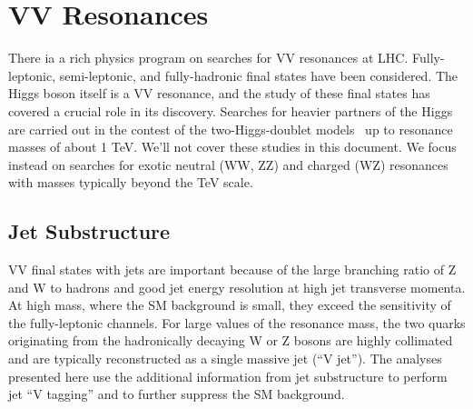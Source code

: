 \documentclass[3p,times,twocolumn]{elsarticle}
\begin{document}

\section{VV Resonances}
\label{sec:VV}

There ia a rich physics program on searches for VV resonances at LHC.
Fully-leptonic, semi-leptonic, and fully-hadronic final states have 
been considered. 
The Higgs boson itself is a VV resonance, and the study of these final
states has covered a crucial role in its discovery. Searches for
heavier partners of the Higgs are carried out in the contest 
of the two-Higgs-doublet models~\cite{Branco:2011iw} up to resonance
masses of about 1 TeV. We'll not cover these studies in this
document. We focus instead on searches for exotic neutral (WW, ZZ) and
charged (WZ) resonances with masses typically beyond the TeV scale. 

\subsection{Jet Substructure}
\label{sec:JetSubstructure}
VV final states with jets are important because of the large
branching ratio of Z and W to hadrons and good jet energy resolution 
at high jet transverse momenta. At high mass, where the SM
background is small, they exceed the sensitivity of the fully-leptonic
channels. For large values of the resonance mass, the two quarks originating
from the hadronically decaying W or Z bosons are highly collimated and
are typically reconstructed as a single massive jet (``V jet'').
The analyses presented here use the additional information 
from jet substructure to perform jet ``V tagging'' and to further 
suppress the SM background.
\end{document}
